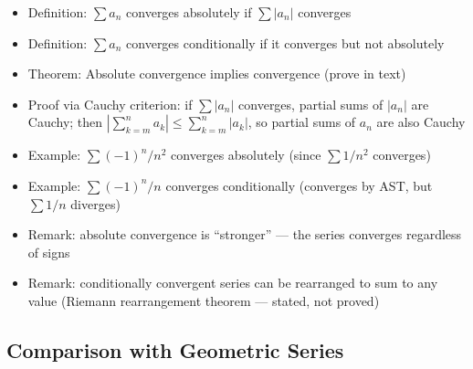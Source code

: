 \documentclass[
  10pt,
  letterpaper,
]{scrbook}
\providecommand{\tightlist}{%
  \setlength{\itemsep}{0pt}\setlength{\parskip}{0pt}}
\begin{document}
\begin{itemize}
\tightlist
\item
  Definition: \(\sum a_n\) converges absolutely if \(\sum |a_n|\)
  converges
\item
  Definition: \(\sum a_n\) converges conditionally if it converges but
  not absolutely
\item
  Theorem: Absolute convergence implies convergence (prove in text)
\item
  Proof via Cauchy criterion: if \(\sum |a_n|\) converges, partial sums
  of \(|a_n|\) are Cauchy; then
  \(|\sum_{k=m}^{n} a_k| \leq \sum_{k=m}^{n} |a_k|\), so partial sums of
  \(a_n\) are also Cauchy
\item
  Example: \(\sum (-1)^n/n^2\) converges absolutely (since
  \(\sum 1/n^2\) converges)
\item
  Example: \(\sum (-1)^n/n\) converges conditionally (converges by AST,
  but \(\sum 1/n\) diverges)
\item
  Remark: absolute convergence is ``stronger'' --- the series converges
  regardless of signs
\item
  Remark: conditionally convergent series can be rearranged to sum to
  any value (Riemann rearrangement theorem --- stated, not proved)
\end{itemize}

\subsection{Comparison with Geometric
Series}\label{comparison-with-geometric-series}
\end{document}
